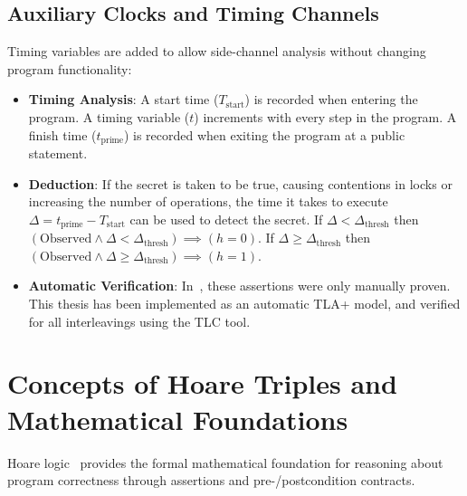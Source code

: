 \documentclass[a4paper,12pt]{report}
\begin{document}
\subsection{Auxiliary Clocks and Timing Channels}
Timing variables are added to allow side-channel analysis without changing program functionality:
\begin{itemize}[itemsep=0.25em, topsep=0.15em]
    \item \textbf{Timing Analysis}: A start time ($T_{\text{start}}$) is recorded when entering the program. A timing variable ($t$) increments with every step in the program. A finish time ($t_{\text{prime}}$) is recorded when exiting the program at a public statement.
    \item \textbf{Deduction}: If the secret is taken to be true, causing contentions in locks or increasing the number of operations, the time it takes to execute $\Delta = t_{\text{prime}} - T_{\text{start}}$ can be used to detect the secret. If $\Delta < \Delta_{\text{thresh}}$ then $(\text{Observed} \land \Delta < \Delta_{\text{thresh}}) \implies (h = 0)$. If $\Delta \ge \Delta_{\text{thresh}}$ then $(\text{Observed} \land \Delta \ge \Delta_{\text{thresh}}) \implies (h = 1)$.
    \item \textbf{Automatic Verification}: In~\cite{ghosal2021axiomatic}, these assertions were only manually proven. This thesis has been implemented as an automatic TLA+ model, and verified for all interleavings using the TLC tool.
\end{itemize}

\section{Concepts of Hoare Triples and Mathematical Foundations}
Hoare logic~\cite{hoare1969axiomatic} provides the formal mathematical foundation for reasoning about program correctness through assertions and pre-/postcondition contracts.
\end{document}
